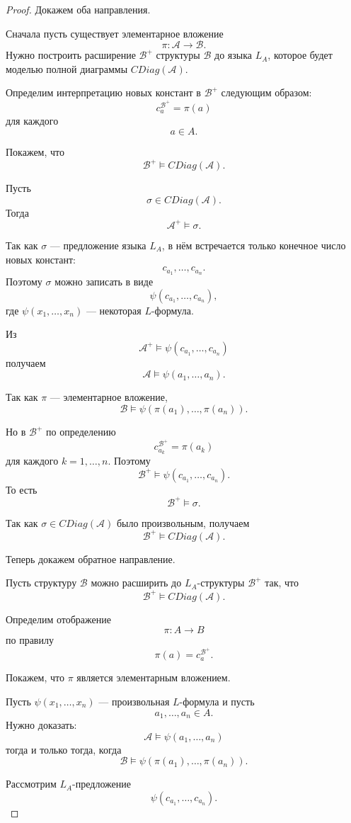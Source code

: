 \documentclass[12pt,a4paper,oneside,openany]{book}
\theoremstyle{definition}
\theoremstyle{plain}
\theoremstyle{remark}
\begin{document}
\begin{proof}
Докажем оба направления.

Сначала пусть существует элементарное вложение
\[
\pi:\mathcal A\to\mathcal B.
\]
Нужно построить расширение $\mathcal B^+$ структуры $\mathcal B$ до языка $L_A$, которое будет моделью полной диаграммы $CDiag(\mathcal A)$.

Определим интерпретацию новых констант в $\mathcal B^+$ следующим образом:
\[
c_a^{\mathcal B^+}=\pi(a)
\]
для каждого
\[
a\in A.
\]

Покажем, что
\[
\mathcal B^+\models CDiag(\mathcal A).
\]

Пусть
\[
\sigma\in CDiag(\mathcal A).
\]
Тогда
\[
\mathcal A^+\models\sigma.
\]

Так как $\sigma$ — предложение языка $L_A$, в нём встречается только конечное число новых констант:
\[
c_{a_1},\ldots,c_{a_n}.
\]
Поэтому $\sigma$ можно записать в виде
\[
\psi(c_{a_1},\ldots,c_{a_n}),
\]
где $\psi(x_1,\ldots,x_n)$ — некоторая $L$-формула.

Из
\[
\mathcal A^+\models\psi(c_{a_1},\ldots,c_{a_n})
\]
получаем
\[
\mathcal A\models\psi(a_1,\ldots,a_n).
\]

Так как $\pi$ — элементарное вложение,
\[
\mathcal B\models\psi(\pi(a_1),\ldots,\pi(a_n)).
\]

Но в $\mathcal B^+$ по определению
\[
c_{a_k}^{\mathcal B^+}=\pi(a_k)
\]
для каждого $k=1,\ldots,n$. Поэтому
\[
\mathcal B^+\models\psi(c_{a_1},\ldots,c_{a_n}).
\]
То есть
\[
\mathcal B^+\models\sigma.
\]

Так как $\sigma\in CDiag(\mathcal A)$ было произвольным, получаем
\[
\mathcal B^+\models CDiag(\mathcal A).
\]

Теперь докажем обратное направление.

Пусть структуру $\mathcal B$ можно расширить до $L_A$-структуры $\mathcal B^+$ так, что
\[
\mathcal B^+\models CDiag(\mathcal A).
\]

Определим отображение
\[
\pi:A\to B
\]
по правилу
\[
\pi(a)=c_a^{\mathcal B^+}.
\]

Покажем, что $\pi$ является элементарным вложением.

Пусть $\psi(x_1,\ldots,x_n)$ — произвольная $L$-формула и пусть
\[
a_1,\ldots,a_n\in A.
\]
Нужно доказать:
\[
\mathcal A\models\psi(a_1,\ldots,a_n)
\]
тогда и только тогда, когда
\[
\mathcal B\models\psi(\pi(a_1),\ldots,\pi(a_n)).
\]

Рассмотрим $L_A$-предложение
\[
\psi(c_{a_1},\ldots,c_{a_n}).
\]


\end{proof}
\end{document}
